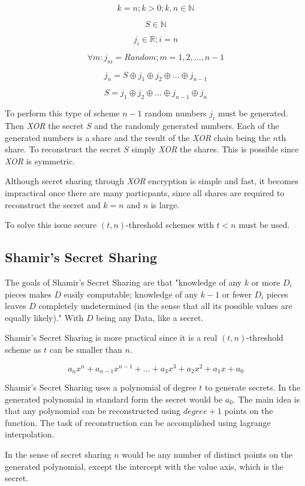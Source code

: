 $$k = n; k > 0;k, n \in \mathbb{N}$$

$$S \in \mathbb{N}$$

$$j_{i} \in \mathbb{R}; i = n$$

$$\forall m: j_{m} = Random; m = {1, 2, ..., n-1}$$

$$j_{n} = S \oplus j_{1} \oplus j_{2} \oplus ... \oplus j_{n-1} $$

$$S = j_{1} \oplus j_{2} \oplus ... \oplus j_{n-1} \oplus j_{n} $$

To perform this type of scheme $n-1$ random numbers $j_{i}$ must be generated.
Then \textit{XOR} the secret $S$ and the randomly generated numbers. Each of
the generated numbers is a share and the result of the \textit{XOR} chain being
the $n$th share. To reconstruct the secret $S$ simply \textit{XOR} the shares.
This is possible since \textit{XOR} is symmetric.

Although secret sharing through \textit{XOR} encryption is simple and fast, it
becomes impractical once there are many particpants, since all shares are
required to reconstruct the secret and $k = n$ and $n$ is large.

To solve this issue secure $(t, n)$-threshold schemes with $t < n$ must be
used.

\subsection{Shamir's Secret Sharing}

The goals of Shamir's Secret Sharing are that "knowledge of any $k$ or more
$D_i$ pieces makes $D$ easily computable; knowledge of any $k - 1$ or fewer
$D_i$ pieces leaves $D$ completely undetermined (in the sense that all its
possible values are equally likely)." With $D$ being any Data, like a secret.

Shamir's Secret Sharing is more practical since it is a real $(t, n)$-threshold
scheme as $t$ can be smaller than $n$.

$$a_{n}x^n + a_{n-1}x^{n-1} + ... + a_{3}x^3 + a_{2}x^2 + a_{1}x + a_0 $$

Shamir's Secret Sharing uses a polynomial of degree $t$ to generate secrets.
In the generated polynomial in standard form the secret would be $a_0$. The
main idea is that any polynomial can be reconstructed using $degree + 1$ points
on the function. The task of reconstruction can be accomplished using lagrange
interpolation.

In the sense of secret sharing $n$ would be any number of distinct points on
the generated polynomial, except the intercept with the value axis, which is
the secret.

